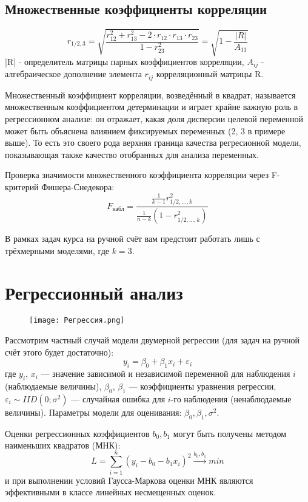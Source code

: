\documentclass[a4paper,12pt]{article} %
\begin{document}
\subsection{Множественные коэффициенты корреляции}

\[r_{1/2,3}=\sqrt{\frac{r_{12}^2+r_{13}^2-2\cdot r_{12}\cdot r_{13}\cdot r{_23}}{1-r_{23}^2}}=\sqrt{1-\frac{|R|}{A_{11}}}\]
|R| - определитель матрицы парных коэффициентов корреляции, $A_{ij}$ - алгебраическое дополнение элемента $r_{ij}$ корреляционный матрицы R.

Множественный коэффициент корреляции, возведённый в квадрат, называется множественным коэффициентом детерминации и играет крайне важную роль в регрессионном анализе: он отражает, какая доля дисперсии целевой переменной может быть объяснена влиянием фиксируемых переменных (2, 3 в примере выше). То есть это своего рода верхняя граница качества регресионной модели, показывающая также качество отобранных для анализа переменных.

Проверка значимости множественного коэффициента корреляции через F-критерий Фишера-Снедекора:
\[ F_{\text{набл}}=\frac{\frac{1}{k-1}r_{1/2,...,k}^2}{\frac{1}{n-k}(1-r_{1/2,...,k}^2)}\]

В рамках задач курса на ручной счёт вам предстоит работать лишь с трёхмерными моделями, где $k=3$.

\section{Регрессионный анализ}

\begin{figure}[htp]
    \centering
    \texttt{[image: Регрессия.png]}
\end{figure}

Рассмотрим частный случай модели двумерной регрессии (для задач на ручной счёт этого будет достаточно):
\[y_i = \beta_0 + \beta_1 x_i + \varepsilon_i\]
где $y_i$, $x_i$ --- значение зависимой и независимой переменной для наблюдения $i$ (наблюдаемые величины), $\beta_0$, $\beta_1$ --- коэффициенты уравнения регрессии, $\varepsilon_i \sim IID (0; \sigma^2)$ --- случайная ошибка для $i$-го наблюдения (ненаблюдаемые величины). Параметры модели для оценивания: $\beta_0, \beta_1, \sigma^2$.

Оценки регрессионных коэффициентов $b_0, b_1$ могут быть получены методом наименьших квадратов (МНК):
\[L = \sum\limits_{i=1}^n(y_i-b_0-b_1 x_i)^2 \xrightarrow{b_0, b_1} min\]
и при выполнении условий Гаусса-Маркова оценки МНК являются эффективными в классе линейных несмещенных оценок.
\end{document}
